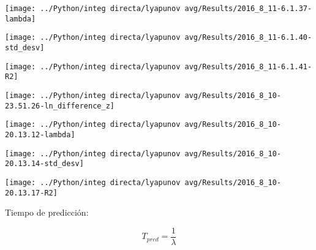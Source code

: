 	\begin{minipage}{0.33\textwidth}
		\begin{center}
			\texttt{[image: ../Python/integ directa/lyapunov avg/Results/2016\_8\_11-6.1.37-lambda]}
		\end{center}
	\end{minipage}
	\begin{minipage}{0.33\textwidth}
		\begin{center}
			\texttt{[image: ../Python/integ directa/lyapunov avg/Results/2016\_8\_11-6.1.40-std\_desv]}
		\end{center}
	\end{minipage}	
	\begin{minipage}{0.33\textwidth}
		\begin{center}
			\texttt{[image: ../Python/integ directa/lyapunov avg/Results/2016\_8\_11-6.1.41-R2]}
		\end{center}
	\end{minipage}
	 
	 
	\begin{center}
		\texttt{[image: ../Python/integ directa/lyapunov avg/Results/2016\_8\_10-23.51.26-ln\_difference\_z]}
	\end{center}
	
	\begin{minipage}{0.33\textwidth}
		\begin{center}
			\texttt{[image: ../Python/integ directa/lyapunov avg/Results/2016\_8\_10-20.13.12-lambda]}
		\end{center}
	\end{minipage}
	\begin{minipage}{0.33\textwidth}
		\begin{center}
			\texttt{[image: ../Python/integ directa/lyapunov avg/Results/2016\_8\_10-20.13.14-std\_desv]}
		\end{center}
	\end{minipage}	
	\begin{minipage}{0.33\textwidth}
		\begin{center}
			\texttt{[image: ../Python/integ directa/lyapunov avg/Results/2016\_8\_10-20.13.17-R2]}
		\end{center}
	\end{minipage} 
	 
	 Tiempo de predicción:
	 
	 \[T_{pred}=\frac{1}{\lambda}\]
	 
